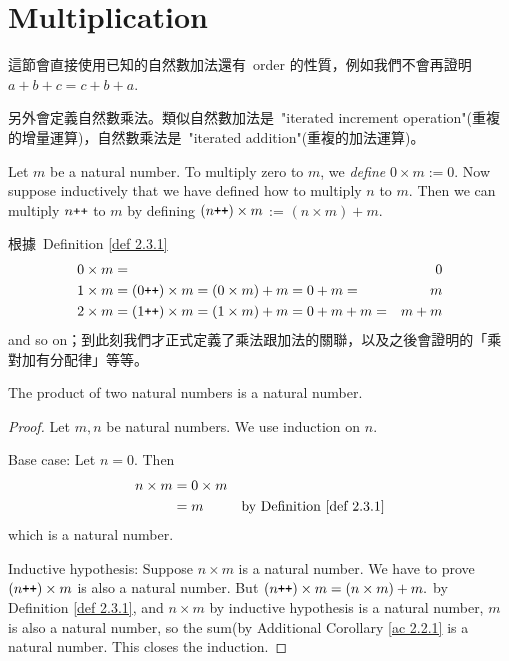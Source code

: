 \section{Multiplication}\label{sec 2.3}

\newcommand{\X}{\times}

\begin{note}
這節會直接使用已知的自然數加法還有\ order 的性質，例如我們不會再證明\ \(a + b + c = c + b + a\).

另外會定義自然數乘法。類似自然數加法是\ "iterated increment operation"(重複的增量運算)，自然數乘法是\ "iterated addition"(重複的加法運算)。
\end{note}

\begin{definition}\label{def 2.3.1} Let \(m\) be a natural number. To multiply zero to \(m\), we \emph{define} \(0 \X m := 0\). Now suppose inductively that we have defined how to multiply \(n\) to \(m\). Then we can multiply \(n\texttt{++}\) to \(m\) by defining \((n\INC) \X m\) := \((n \X m) + m\).
\end{definition}

\begin{note}
根據\ Definition \ref{def 2.3.1}
    \begin{align*}
    0 \X m & = & 0 \\
    1 \X m & = (0\INC) \X m = (0 \X m) + m = 0 + m = & m \\
    2 \X m & = (1\INC) \X m = (1 \X m) + m = 0 + m + m = & m + m
    \end{align*}
and so on；到此刻我們才正式定義了乘法跟加法的關聯，以及之後會證明的「乘對加有分配律」等等。
\end{note}

\begin{additional corollary} \label{ac 2.3.1}
The product of two natural numbers is a natural number.
\end{additional corollary}
\begin{proof}
Let \(m, n\) be natural numbers. We use induction on \(n\).

Base case: Let \(n = 0\). Then
\begin{align*}
    n \X m & = 0 \X m & \\
           & = m      & \text{by Definition \ref{def 2.3.1}}
\end{align*}
which is a natural number.

Inductive hypothesis: Suppose \(n \X m\) is a natural number. We have to prove \((n\INC) \X m\) is also a natural number. But \((n\INC) \X m = (n \X m) + m.\) by Definition \ref{def 2.3.1}, and \(n \X m\) by inductive hypothesis is a natural number, \(m\) is also a natural number, so the sum(by Additional Corollary \ref{ac 2.2.1} is a natural number. This closes the induction.
\end{proof}


